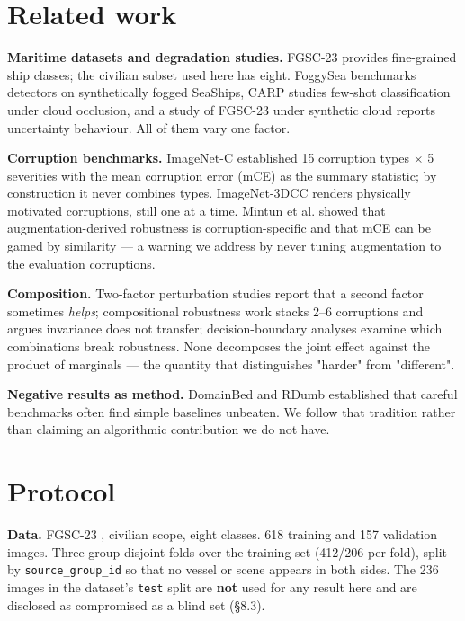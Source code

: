 \section{Related work}
\textbf{Maritime datasets and degradation studies.} FGSC-23 \cite{zhang2020fgsc23} provides fine-grained ship classes; the civilian subset used here has eight. FoggySea \cite{yang2026foggysea} benchmarks detectors on synthetically fogged SeaShips, CARP \cite{zhan2025carp} studies few-shot classification under cloud occlusion, and a study of FGSC-23 under synthetic cloud \cite{manca2026waves} reports uncertainty behaviour. All of them vary one factor.

\textbf{Corruption benchmarks.} ImageNet-C \cite{hendrycks2019imagenetc} established 15 corruption types $\times$ 5 severities with the mean corruption error (mCE) as the summary statistic; by construction it never combines types. ImageNet-3DCC \cite{kar20223dcc} renders physically motivated corruptions, still one at a time. Mintun et al. \cite{mintun2021augcorruption} showed that augmentation-derived robustness is corruption-specific and that mCE can be gamed by similarity --- a warning we address by never tuning augmentation to the evaluation corruptions.

\textbf{Composition.} Two-factor perturbation studies \cite{dai2022twofactor} report that a second factor sometimes \emph{helps}; compositional robustness work \cite{mason2023modularity} stacks 2--6 corruptions and argues invariance does not transfer; decision-boundary analyses \cite{wang2026realboundary} examine which combinations break robustness. None decomposes the joint effect against the product of marginals --- the quantity that distinguishes "harder" from "different".

\textbf{Negative results as method.} DomainBed \cite{gulrajani2021domainbed} and RDumb \cite{press2023rdumb} established that careful benchmarks often find simple baselines unbeaten. We follow that tradition rather than claiming an algorithmic contribution we do not have.

\section{Protocol}
\textbf{Data.} FGSC-23 \cite{zhang2020fgsc23}, civilian scope, eight classes. 618 training and 157 validation images. Three group-disjoint folds over the training set (412/206 per fold), split by \texttt{source\_group\_id} so that no vessel or scene appears in both sides. The 236 images in the dataset's \texttt{test} split are \textbf{not} used for any result here and are disclosed as compromised as a blind set (§8.3).

